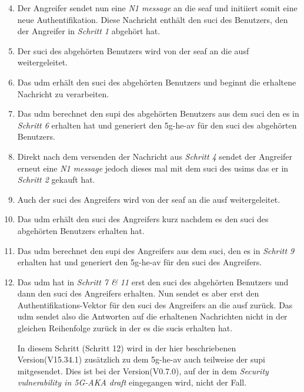 \begin{enumerate}
\setcounter{enumi}{3}

\item Der Angreifer sendet nun eine \textit{N1 message} an die \gls{seaf} und initiiert somit eine neue Authentifikation.
Diese Nachricht enthält den \gls{suci} des Benutzers, den der Angreifer in \textit{Schritt 1} abgehört hat.

\item Der \gls{suci} des abgehörten Benutzers wird von der \gls{seaf} an die \gls{ausf} weitergeleitet.

\item Das \gls{udm} erhält den \gls{suci} des abgehörten Benutzers und beginnt die erhaltene Nachricht zu verarbeiten.

\item Das \gls{udm} berechnet den \gls{supi} des abgehörten Benutzers aus dem \gls{suci} den es in \textit{Schritt 6} erhalten hat und generiert den \gls{5g-he-av} für den \gls{suci} des abgehörten Benutzers.

\item Direkt nach dem versenden der Nachricht aus \textit{Schritt 4} sendet der Angreifer erneut eine \textit{N1 message} jedoch dieses mal mit dem \gls{suci} des \gls{usim}s das er in \textit{Schritt 2} gekauft hat.

\item Auch der \gls{suci} des Angreifers wird von der \gls{seaf} an die \gls{ausf} weitergeleitet.

\item Das \gls{udm} erhält den \gls{suci} des Angreifers kurz nachdem es den \gls{suci} des abgehörten Benutzers erhalten hat.

\item Das \gls{udm} berechnet den \gls{supi} des Angreifers aus dem \gls{suci}, den es in \textit{Schritt 9} erhalten hat und generiert den \gls{5g-he-av} für den \gls{suci} des Angreifers.

\item Das \gls{udm} hat in \textit{Schritt 7 \& 11} erst den \gls{suci} des abgehörten Benutzers und dann den \gls{suci} des Angreifers erhalten.
Nun sendet es aber erst den Authentifikations-Vektor für den \gls{suci} des Angreifers an die \gls{ausf} zurück.
Das \gls{udm} sendet also die Antworten auf die erhaltenen Nachrichten nicht in der gleichen Reihenfolge zurück in der es die \gls{suci}s erhalten hat.

In diesem Schritt (Schritt 12) wird in der hier beschriebenen Version(V15.34.1) zusätzlich zu dem \gls{5g-he-av} auch teilweise der \gls{supi} mitgesendet.
Dies ist bei der Version(V0.7.0), auf der in dem \textit{Security vulnerability in 5G-AKA draft} eingegangen wird, nicht der Fall.


\end{enumerate}
